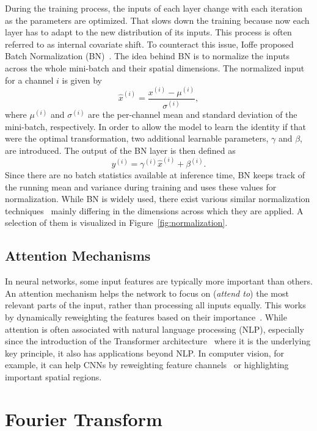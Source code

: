 During the training process, the inputs of each layer change with each iteration as the parameters are optimized.
That slows down the training because now each layer has to adapt to the new distribution of its inputs. This process is
often referred to as internal covariate shift.
To counteract this issue, Ioffe \etal proposed Batch Normalization (BN)~\cite{BatchNorm}.
The idea behind BN is to normalize the inputs across the whole mini-batch and their spatial dimensions.
The normalized input for a channel $i$ is given by
\begin{equation}
    \hat{x}^{(i)} = \frac{x^{(i)} - \mu^{(i)}}{\sigma^{(i)}},
\end{equation} 
where $\mu^{(i)}$ and $\sigma^{(i)}$ are the per-channel mean and standard deviation of the mini-batch, respectively.  
In order to allow the model to learn the identity if that were the optimal transformation, two additional learnable
parameters, $\gamma$ and $\beta$, are introduced. The output of the BN layer is then defined as
\begin{equation}
    y^{(i)} = \gamma^{(i)}\hat{x}^{(i)} + \beta^{(i)}.
\end{equation}
Since there are no batch statistics available at inference time, BN keeps track of the running mean and variance during
training and uses these values for normalization.
While BN is widely used, there exist various similar normalization techniques~\cite{LayerNorm, InstanceNorm, GroupNorm}
mainly differing in the dimensions across which they are applied.
A selection of them is visualized in Figure~\ref{fig:normalization}.


\subsection{Attention Mechanisms}

In neural networks, some input features are typically more important than others.
An attention mechanism helps the network to focus on (\textit{attend to}) the most relevant parts of the
input, rather than processing all inputs equally.
This works by dynamically reweighting the features based on their importance~\cite{Attention}.
While attention is often associated with natural language processing (NLP), especially since the introduction of the
Transformer architecture~\cite{Transformer} where it is the underlying key principle, it also has applications beyond
NLP.\@
In computer vision, for example, it can help CNNs by reweighting feature channels~\cite{SqueezeExcite} or
highlighting important spatial regions.

\section{Fourier Transform}
